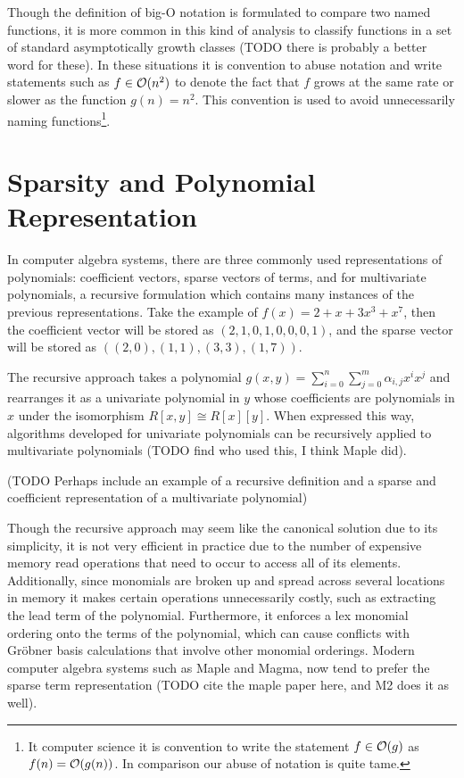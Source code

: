 Though the definition of big-O notation is formulated to compare two named functions, it is more common in this kind of analysis to classify functions in a set of standard asymptotically growth classes (TODO there is probably a better word for these). In these situations it is convention to abuse notation and write statements such as $f \in \mathcal O(n^2)$ to denote the fact that $f$ grows at the same rate or slower as the function $g(n) = n^2$. This convention is used to avoid unnecessarily naming functions\footnote{It computer science it is convention to write the statement $f \in \mathcal O(g)$ as $f(n) = \mathcal O(g(n))$. In comparison our abuse of notation is quite tame.}.

\section{Sparsity and Polynomial Representation}

In computer algebra systems, there are three commonly used representations of polynomials: coefficient vectors, sparse vectors of terms, and for multivariate polynomials, a recursive formulation which contains many instances of the previous representations. Take the example of $f(x) = 2 + x + 3x^3 + x^7$, then the coefficient vector will be stored as $(2, 1, 0, 1, 0, 0, 0, 1)$, and the sparse vector will be stored as $((2, 0), (1, 1), (3, 3), (1, 7))$.

The recursive approach takes a polynomial $g(x, y) = \sum_{i= 0}^n \sum_{j = 0}^m \alpha_{i, j} x^i x^j$ and rearranges it as a univariate polynomial in $y$ whose coefficients are polynomials in $x$ under the isomorphism $R[x, y] \cong R[x][y]$. When expressed this way, algorithms developed for univariate polynomials can be recursively applied to multivariate polynomials (TODO find who used this, I think Maple did).

\medskip

(TODO Perhaps include an example of a recursive definition and a sparse and coefficient representation of a multivariate polynomial)

\medskip

Though the recursive approach may seem like the canonical solution due to its simplicity, it is not very efficient in practice due to the number of expensive memory read operations that need to occur to access all of its elements. Additionally, since monomials are broken up and spread across several locations in memory it makes certain operations unnecessarily costly, such as extracting the lead term of the polynomial. Furthermore, it enforces a lex monomial ordering onto the terms of the polynomial, which can cause conflicts with Gr\"{o}bner basis calculations that involve other monomial orderings. Modern computer algebra systems such as Maple and Magma, now tend to prefer the sparse term representation (TODO cite the maple paper here, and M2 does it as well).

